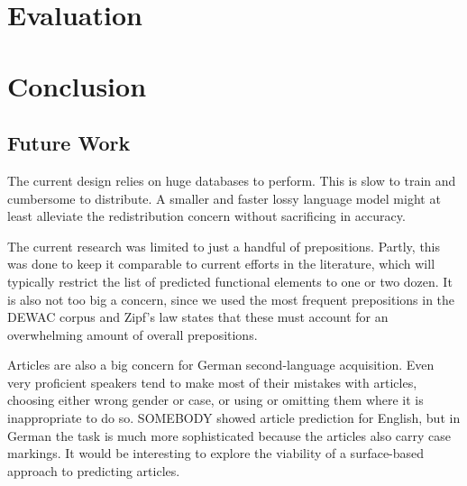\documentclass[12pt]{article}
\begin{document}
\section{Evaluation}

\section{Conclusion}

\subsection{Future Work}

The current design relies on huge databases to perform. This is slow to train
and cumbersome to distribute. A smaller and faster lossy language model might at
least alleviate the redistribution concern without sacrificing in accuracy.

The current research was limited to just a handful of prepositions. Partly, this
was done to keep it comparable to current efforts in the literature, which will
typically restrict the list of predicted functional elements to one or two
dozen. It is also not too big a concern, since we used the most frequent
prepositions in the DEWAC corpus and Zipf's law %
states that these must account for an overwhelming amount of overall
prepositions. %

Articles are also a big concern for German second-language acquisition. Even
very proficient speakers tend to make most of their mistakes with articles,
choosing either wrong gender or case, or using or omitting them where it is
inappropriate to do so. SOMEBODY %
showed article prediction for English, but in German the task is much more
sophisticated because the articles also carry case markings. It would be
interesting to explore the viability of a surface-based approach to predicting
articles.


\end{document}
